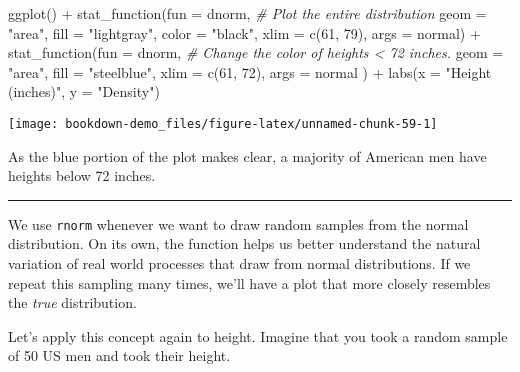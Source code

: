 \documentclass[
]{book}
\newenvironment{Shaded}{\begin{snugshade}}{\end{snugshade}}
\newcommand{\AttributeTok}[1]{\textcolor[rgb]{0.77,0.63,0.00}{#1}}
\newcommand{\CommentTok}[1]{\textcolor[rgb]{0.56,0.35,0.01}{\textit{#1}}}
\newcommand{\DecValTok}[1]{\textcolor[rgb]{0.00,0.00,0.81}{#1}}
\newcommand{\FunctionTok}[1]{\textcolor[rgb]{0.00,0.00,0.00}{#1}}
\newcommand{\NormalTok}[1]{#1}
\newcommand{\SpecialCharTok}[1]{\textcolor[rgb]{0.00,0.00,0.00}{#1}}
\newcommand{\StringTok}[1]{\textcolor[rgb]{0.31,0.60,0.02}{#1}}
\begin{document}
\begin{Shaded}
\begin{Highlighting}[]
\FunctionTok{ggplot}\NormalTok{() }\SpecialCharTok{+}
  \FunctionTok{stat\_function}\NormalTok{(}\AttributeTok{fun =}\NormalTok{ dnorm, }\CommentTok{\# Plot the entire distribution}
                \AttributeTok{geom =} \StringTok{"area"}\NormalTok{,}
                \AttributeTok{fill =} \StringTok{"lightgray"}\NormalTok{,}
                \AttributeTok{color =} \StringTok{"black"}\NormalTok{,}
                \AttributeTok{xlim =} \FunctionTok{c}\NormalTok{(}\DecValTok{61}\NormalTok{, }\DecValTok{79}\NormalTok{),}
                \AttributeTok{args =}\NormalTok{ normal) }\SpecialCharTok{+}
  \FunctionTok{stat\_function}\NormalTok{(}\AttributeTok{fun =}\NormalTok{ dnorm, }\CommentTok{\# Change the color of heights \textless{} 72 inches.}
                \AttributeTok{geom =} \StringTok{"area"}\NormalTok{,}
                \AttributeTok{fill =} \StringTok{"steelblue"}\NormalTok{,}
                \AttributeTok{xlim =} \FunctionTok{c}\NormalTok{(}\DecValTok{61}\NormalTok{, }\DecValTok{72}\NormalTok{),}
                \AttributeTok{args =}\NormalTok{ normal}
\NormalTok{                ) }\SpecialCharTok{+}
  \FunctionTok{labs}\NormalTok{(}\AttributeTok{x =} \StringTok{"Height (inches)"}\NormalTok{, }\AttributeTok{y =} \StringTok{"Density"}\NormalTok{)}
\end{Highlighting}
\end{Shaded}

\begin{center}\texttt{[image: bookdown-demo\_files/figure-latex/unnamed-chunk-59-1]} \end{center}

As the blue portion of the plot makes clear, a majority of American men have heights below 72 inches.

\begin{center}\rule{0.5\linewidth}{0.5pt}\end{center}

We use \texttt{rnorm} whenever we want to draw random samples from the normal distribution. On its own, the function helps us better understand the natural variation of real world processes that draw from normal distributions. If we repeat this sampling many times, we'll have a plot that more closely resembles the \emph{true} distribution.

Let's apply this concept again to height. Imagine that you took a random sample of 50 US men and took their height.
\end{document}
